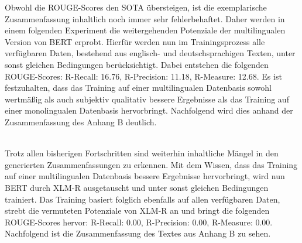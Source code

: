 \noindent
Obwohl die \ac{ROUGE}-Scores den \ac{SOTA} übersteigen, ist die exemplarische Zusammenfassung inhaltlich noch immer sehr fehlerbehaftet. Daher werden in einem folgenden Experiment die weitergehenden Potenziale der multilingualen Version von \ac{BERT} erprobt. Hierfür werden nun im Trainingsprozess alle verfügbaren Daten, bestehend aus englisch- und deutschsprachigen Texten, unter sonst gleichen Bedingungen berücksichtigt. Dabei entstehen die folgenden \ac{ROUGE}-Scores: R-Recall: 16.76, R-Precision: 11.18, R-Measure: 12.68. Es ist festzuhalten, dass das Training auf einer multilingualen Datenbasis sowohl wertmäßig als auch subjektiv qualitativ bessere Ergebnisse als das Training auf einer monolingualen Datenbasis hervorbringt. Nachfolgend wird dies anhand der Zusammenfassung des Anhang B deutlich.\\

\noindent{}\\
\newline

\noindent
Trotz allen bisherigen Fortschritten sind weiterhin inhaltliche Mängel in den generierten Zusammenfassungen zu erkennen. Mit dem Wissen, dass das Training auf einer multilingualen Datenbasis bessere Ergebnisse hervorbringt, wird nun \ac{BERT} durch \ac{XLM-R} ausgetauscht und unter sonst gleichen Bedingungen trainiert. Das Training basiert folglich ebenfalls auf allen verfügbaren Daten, strebt die vermuteten Potenziale von \ac{XLM-R} an und bringt die folgenden \ac{ROUGE}-Scores hervor: R-Recall: 0.00, R-Precision: 0.00, R-Measure: 0.00. Nachfolgend ist die Zusammenfassung des Textes aus Anhang B zu sehen.\\

\noindent{}\\
\newline
 




